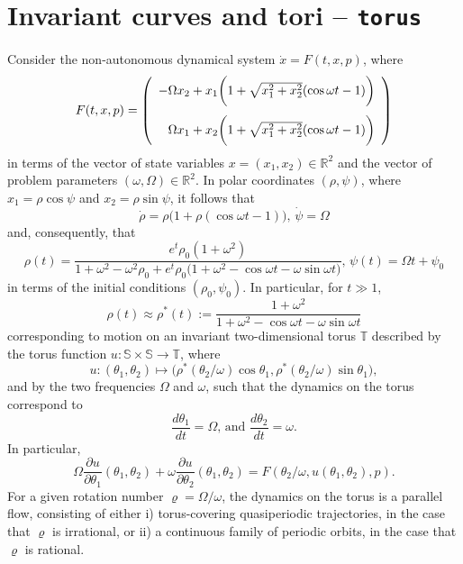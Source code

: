 \section{Invariant curves and tori -- \texttt{torus}}
Consider the non-autonomous dynamical system $\dot{x}=F(t,x,p)$, where
\begin{equation}
F(t,x,p) = \left(\begin{array}{r}\vspace{0.1in}-\Omega x_2+x_1\bigg(1+\sqrt{x_1^2+x_2^2}(\cos\omega t-1)\bigg)\\
\Omega x_1+x_2\bigg(1+\sqrt{x_1^2+x_2^2}(\cos\omega t-1)\bigg)\end{array}\right)
\end{equation}
in terms of the vector of state variables $x=(x_1,x_2)\in\mathbb{R}^2$ and the vector of problem parameters $(\omega,\Omega)\in\mathbb{R}^2$. In polar coordinates $(\rho,\psi)$, where $x_1=\rho\cos\psi$ and $x_2=\rho\sin\psi$, it follows that
\begin{equation}
\dot{\rho}=\rho\big(1+\rho(\cos\omega t-1)\big),\,\dot{\psi}=\Omega
\end{equation}
and, consequently, that
\begin{equation}
\rho(t)=\frac{e^t \rho_0(1+\omega^2)}{1+\omega^2-\omega^2\rho_0+e^t \rho_0\big(1+\omega^2-\cos\omega t-\omega\sin\omega t\big)},\,\psi(t)=\Omega t+\psi_0
\label{eq: timehist}
\end{equation}
in terms of the initial conditions $(\rho_0,\psi_0)$. In particular, for $t\gg 1$,
\begin{equation}
\rho(t)\approx \rho^\ast(t):=\frac{1+\omega^2}{1+\omega^2-\cos\omega t-\omega\sin\omega t}
\end{equation}
corresponding to motion on an invariant two-dimensional torus $\mathbb{T}$ described by the torus function $u:\mathbb{S}\times\mathbb{S}\rightarrow\mathbb{T}$, where
\begin{equation}
u:(\theta_1,\theta_2)\mapsto\big(\rho^\ast(\theta_2/\omega)\cos\theta_1,\rho^\ast(\theta_2/\omega)\sin\theta_1\big),
\end{equation}
and by the two frequencies $\Omega$ and $\omega$, such that the dynamics on the torus correspond to
\begin{equation}
\frac{d\theta_1}{dt}=\Omega\mbox{, and }\frac{d\theta_2}{dt}=\omega.
\end{equation}
In particular,
\begin{equation}
\Omega \frac{\partial u}{\partial \theta_1}(\theta_1,\theta_2)+\omega\frac{\partial u}{\partial \theta_2}(\theta_1,\theta_2)=F(\theta_2/\omega,u(\theta_1,\theta_2),p).
\end{equation}
For a given rotation number $\varrho=\Omega/\omega$, the dynamics on the torus is a parallel flow, consisting of either i) torus-covering quasiperiodic trajectories, in the case that $\varrho$ is irrational, or ii) a continuous family of periodic orbits, in the case that $\varrho$ is rational.

